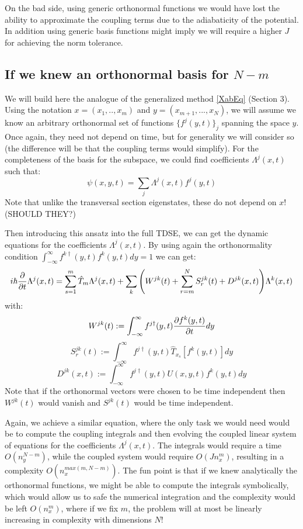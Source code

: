 \documentclass[11pt, a4paper]{article} %
\begin{document}
On the bad side, using generic orthonormal functions we would have lost the ability to approximate the coupling terms due to the adiabaticity of the potential. In addition using generic basis functions might imply we will require a higher $J$ for achieving the norm tolerance.

\subsection{If we knew an orthonormal basis for $N-m$}
We will build here the analogue of the generalized method \eqref{XabEq} (Section 3). Using the notation $x=(x_1,..,x_m)$ and $y=(x_{m+1},...,x_N)$, we will assume we know an arbitrary orthonormal set of functions $\{ f^j(y,t) \}_j$ spanning the space $y$. Once again, they need not depend on time, but for generality we will consider so (the difference will be that the coupling terms would simplify). For the completeness of the basis for the subspace, we could find coefficients $\Lambda^j(x,t)$ such that:
\begin{equation}
\psi(x,y,t)=\sum_j \Lambda^j(x,t) f^j(y,t)
\end{equation}
Note that unlike the transversal section eigenstates, these do not depend on $x$! (SHOULD THEY?)

Then introducing this ansatz into the full TDSE, we can get the dynamic equations for the coefficients $\Lambda^j(x,t)$. By using again the orthonormality condition $\int_{-\infty}^{\infty}f^{k\dagger}(y,t)f^k(y,t)dy=1$ we can get:
\begin{equation}
i\hbar \pdv{}{t}\Lambda^j(x,t)= \sum_{s=1}^m \hat{T}_m \Lambda^j(x,t) + \sum_k \qty( W^{jk}(t)+\sum_{r=m}^NS^{jk}_r(t)+D^{jk}(x,t) )\Lambda^k(x,t)
\end{equation}
with:
\begin{equation}
W^{jk}(t):=\int_{-\infty}^{\infty}f^{j\dagger}(y,t) \pdv{f^k(y,t)}{t} dy
\end{equation}
\begin{equation}
S^{jk}_r(t):=\int_{-\infty}^{\infty}f^{j\dagger}(y,t) \hat{T}_{x_s}[f^k(y,t)] dy
\end{equation}
\begin{equation}
D^{jk}(x,t):=\int_{-\infty}^{\infty}f^{j\dagger}(y,t)U(x,y,t) f^k(y,t) dy
\end{equation}
Note that if the orthonormal vectors were chosen to be time independent then $W^{jk}(t)$ would vanish and $S^{jk}(t)$ would be time independent. 

Again, we achieve a similar equation, where the only task we would need would be to compute the coupling integrals and then evolving the coupled linear system of equations for the coefficients $\Lambda^j(x,t)$. The integrals would require a time $O(n_y^{N-m})$, while the coupled system would require $O(Jn_x^m)$, resulting in a complexity $O(n_x^{max(m, N-m)})$. The fun point is that if we knew analytically the orthonormal functions, we might be able to compute the integrals symbolically, which would allow us to safe the numerical integration and the complexity would be left $O(n_x^m)$, where if we fix $m$, the problem will at most be linearly increasing in complexity with dimensions $N$!
\end{document}
